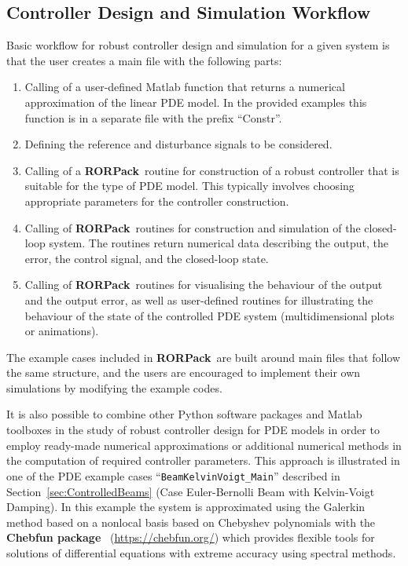 \documentclass[11pt, a4paper]{amsart}
\theoremstyle{definition}
\numberwithin{equation}{section}
\newcommand{\RORname}{\textbf{RORPack}}
\begin{document}
\subsection{Controller Design and Simulation Workflow}

Basic workflow for robust controller design and simulation for a given system is that the user creates a main file with the following parts:
\begin{enumerate}
  \item Calling of a user-defined Matlab function that returns a numerical approximation of the linear PDE model. In the provided examples this function is in a separate file with the prefix ``Constr''.
  \item Defining the reference and disturbance signals to be considered.
  \item Calling of a \RORname\ routine for construction of a robust controller that is suitable for the type of PDE model.
    This typically involves choosing appropriate parameters for the controller construction.
  \item Calling of \RORname\ routines for construction and simulation of the closed-loop system. The routines return numerical data describing the output, the error, the control signal, and the closed-loop state.
  \item Calling of \RORname\ routines for visualising the behaviour of the output and the output error, as well as 
    user-defined routines for illustrating the behaviour of the state of the controlled PDE system (multidimensional plots or animations).
\end{enumerate}
The example cases included in \RORname\ are built around main files that follow the same structure, and the users are encouraged to implement their own simulations by modifying the example codes.

It is also possible to combine other Python software packages and Matlab toolboxes in the study of robust controller design for PDE models in order to employ ready-made numerical approximations or additional numerical methods in the computation of required controller parameters. This approach is illustrated in one of the PDE example cases ``\texttt{BeamKelvinVoigt\_Main}'' described in Section~\ref{sec:ControlledBeams} (Case Euler-Bernolli Beam with Kelvin-Voigt Damping).
In this example the system is approximated using the Galerkin method based on a nonlocal basis based on Chebyshev polynomials with the \textbf{Chebfun package}~\cite{DriHal14book} (\href{https://chebfun.org/}{https://chebfun.org/}) which provides flexible tools for solutions of differential equations with extreme accuracy using spectral methods. 
\end{document}
